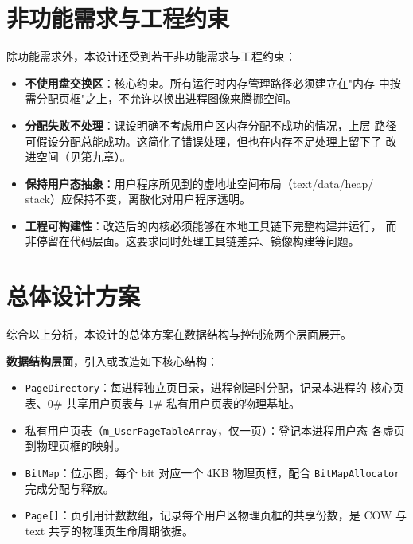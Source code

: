 \section{非功能需求与工程约束}
除功能需求外，本设计还受到若干非功能需求与工程约束：

\begin{itemize}
  \item \textbf{不使用盘交换区}：核心约束。所有运行时内存管理路径必须建立在"内存
        中按需分配页框"之上，不允许以换出进程图像来腾挪空间。
  \item \textbf{分配失败不处理}：课设明确不考虑用户区内存分配不成功的情况，上层
        路径可假设分配总能成功。这简化了错误处理，但也在内存不足处理上留下了
        改进空间（见第九章）。
  \item \textbf{保持用户态抽象}：用户程序所见到的虚地址空间布局（text/data/heap/
        stack）应保持不变，离散化对用户程序透明。
  \item \textbf{工程可构建性}：改造后的内核必须能够在本地工具链下完整构建并运行，
        而非停留在代码层面。这要求同时处理工具链差异、镜像构建等问题。
\end{itemize}

\section{总体设计方案}
综合以上分析，本设计的总体方案在数据结构与控制流两个层面展开。

\textbf{数据结构层面}，引入或改造如下核心结构：
\begin{itemize}
  \item \texttt{PageDirectory}：每进程独立页目录，进程创建时分配，记录本进程的
        核心页表、0\# 共享用户页表与 1\# 私有用户页表的物理基址。
  \item 私有用户页表（\texttt{m\_UserPageTableArray}，仅一页）：登记本进程用户态
        各虚页到物理页框的映射。
  \item \texttt{BitMap}：位示图，每个 bit 对应一个 4KB 物理页框，配合
        \texttt{BitMapAllocator} 完成分配与释放。
  \item \texttt{Page[]}：页引用计数数组，记录每个用户区物理页框的共享份数，是
        COW 与 text 共享的物理页生命周期依据。
\end{itemize}

